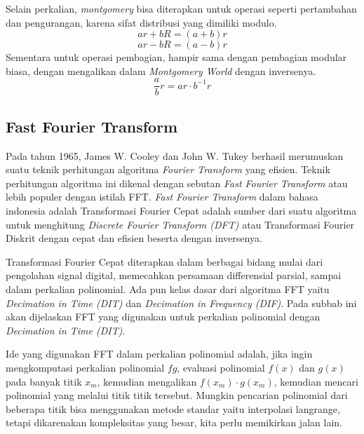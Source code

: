 Selain perkalian, \textit{montgomery} bisa diterapkan untuk operasi seperti pertambahan dan pengurangan, karena sifat distribusi yang dimiliki modulo.
$$ ar + bR = (a+b)r $$
$$ ar - bR = (a-b)r $$
Sementara untuk operasi pembagian, hampir sama dengan pembagian modular biasa, dengan mengalikan dalam \textit{Montgomery World} dengan inversenya.
$$ \frac{a}{b}r = ar \cdot b^{-1}r $$

\subsection{Fast Fourier Transform}
Pada tahun 1965, James W. Cooley dan John W. Tukey berhasil merumuskan suatu teknik perhitungan algoritma \textit{Fourier Transform} yang efisien\cite{fft}. Teknik perhitungan algoritma ini dikenal dengan sebutan \textit{Fast Fourier Transform} atau lebih populer dengan istilah FFT. \textit{Fast Fourier Transform} dalam bahasa indonesia adalah Transformasi Fourier Cepat adalah sumber dari suatu algoritma untuk menghitung \textit{Discrete Fourier Transform (DFT)} atau Transformasi Fourier Diskrit dengan cepat dan efisien beserta dengan inversenya.

Transformasi Fourier Cepat diterapkan dalam berbagai bidang mulai dari pengolahan signal digital, memecahkan persamaan differensial parsial, sampai dalam perkalian polinomial. Ada pun kelas dasar dari algoritma FFT yaitu \textit{Decimation in Time (DIT)} dan \textit{Decimation in Frequency (DIF)}. Pada subbab ini akan dijelaskan FFT yang digunakan untuk perkalian polinomial dengan \textit{Decimation in Time (DIT)}.

Ide yang digunakan FFT dalam perkalian polinomial adalah, jika ingin mengkomputasi perkalian polinomial $ fg $, evaluasi polinomial $ f(x) $ dan $ g(x) $ pada banyak titik $ x_m $, kemudian mengalikan $ f(x_m) \cdot g(x_m) $, kemudian mencari polinomial yang melalui titik titik tersebut. Mungkin pencarian polinomial dari beberapa titik bisa menggunakan metode standar yaitu interpolasi langrange, tetapi dikarenakan kompleksitas yang besar, kita perlu memikirkan jalan lain.

